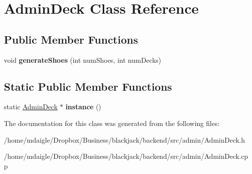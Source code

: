 \hypertarget{classAdminDeck}{
\section{\-Admin\-Deck \-Class \-Reference}
\label{classAdminDeck}
}
\subsection*{\-Public \-Member \-Functions}
\begin{DoxyCompactItemize}
\item 
\hypertarget{classAdminDeck_a60c5e419520a7db61f09af8d1ff8b13d}{
void {\bfseries generate\-Shoes} (int num\-Shoes, int num\-Decks)}
\label{classAdminDeck_a60c5e419520a7db61f09af8d1ff8b13d}

\end{DoxyCompactItemize}
\subsection*{\-Static \-Public \-Member \-Functions}
\begin{DoxyCompactItemize}
\item 
\hypertarget{classAdminDeck_a25ade36efcec8c7fb918ffc0f6e99bac}{
static \hyperlink{classAdminDeck}{\-Admin\-Deck} $\ast$ {\bfseries instance} ()}
\label{classAdminDeck_a25ade36efcec8c7fb918ffc0f6e99bac}

\end{DoxyCompactItemize}


\-The documentation for this class was generated from the following files\-:\begin{DoxyCompactItemize}
\item 
/home/mdaigle/\-Dropbox/\-Business/blackjack/backend/src/admin/\-Admin\-Deck.\-h\item 
/home/mdaigle/\-Dropbox/\-Business/blackjack/backend/src/admin/\-Admin\-Deck.\-cpp\end{DoxyCompactItemize}
